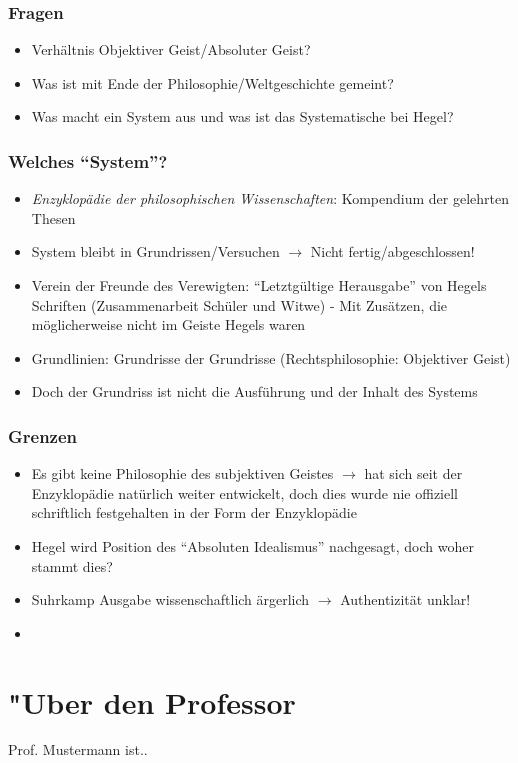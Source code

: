 \documentclass[emulatestandardclasses]{scrartcl}
\begin{document}
\subsubsection{Fragen}

\begin{itemize}
  \item Verhältnis Objektiver Geist/Absoluter Geist?
  \item Was ist mit Ende der Philosophie/Weltgeschichte gemeint?
  \item Was macht ein System aus und was ist das Systematische bei Hegel?
\end{itemize}

\subsubsection{Welches "`System"'?}

\begin{itemize}
  \item \emph{Enzyklopädie der philosophischen Wissenschaften}: Kompendium der gelehrten Thesen
  \item System bleibt in Grundrissen/Versuchen $\rightarrow$ Nicht fertig/abgeschlossen!
  \item Verein der Freunde des Verewigten: "`Letztgültige Herausgabe"' von Hegels Schriften (Zusammenarbeit Schüler und Witwe) - Mit Zusätzen, die möglicherweise nicht im Geiste Hegels waren
  \item Grundlinien: Grundrisse der Grundrisse (Rechtsphilosophie: Objektiver Geist)
  \item Doch der Grundriss ist nicht die Ausführung und der Inhalt des Systems
\end{itemize}

\subsubsection{Grenzen}

\begin{itemize}
  \item Es gibt keine Philosophie des subjektiven Geistes $\rightarrow$ hat sich seit der Enzyklopädie natürlich weiter entwickelt, doch dies wurde nie offiziell schriftlich festgehalten in der Form der Enzyklopädie
  \item Hegel wird Position des "`Absoluten Idealismus"' nachgesagt, doch woher stammt dies?
  \item Suhrkamp Ausgabe wissenschaftlich ärgerlich $\rightarrow$ Authentizität unklar! 
  \item 
\end{itemize}


\newpage
\section{"Uber den Professor}
Prof. Mustermann ist..


\end{document}

